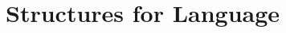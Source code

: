 \documentclass{report}
\theoremstyle{definition}
\theoremstyle{plain}
\begin{document}
%
%
%
%
%
%
%
%
%
%
%
%




\section{Structures for Language}
\end{document}
